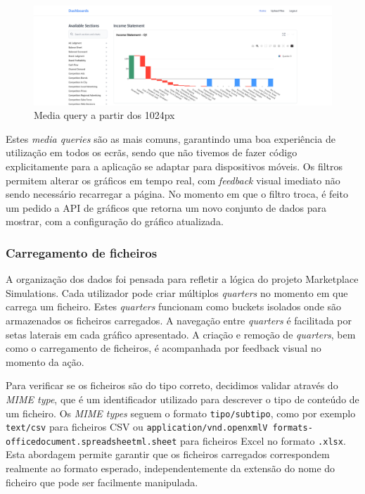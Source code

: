 \begin{figure}[htbp]
    \centering
    \includegraphics[max width=\textwidth]{./img/res_1920}
 \caption{Media query a partir dos 1024px}
 \label{fig:res_1920}
\end{figure}

Estes \textit{media queries} são as mais comuns, garantindo uma boa experiência de utilização em todos os ecrãs, sendo que não tivemos de fazer código explicitamente para a aplicação se adaptar para dispositivos móveis. Os filtros permitem alterar os gráficos em tempo real, com \textit{feedback} visual imediato não sendo necessário recarregar a página. No momento em que o filtro troca, é feito um pedido a API de gráficos que retorna um novo conjunto de dados para mostrar, com a configuração do gráfico atualizada.

\subsubsection{Carregamento de ficheiros}

A organização dos dados foi pensada para refletir a lógica do projeto Marketplace Simulations. Cada utilizador pode criar múltiplos \textit{quarters} no momento em que carrega um ficheiro. Estes \textit{quarters} funcionam como buckets isolados onde são armazenados os ficheiros carregados. A navegação entre \textit{quarters} é facilitada por setas laterais em cada gráfico apresentado. A criação e remoção de \textit{quarters}, bem como o carregamento de ficheiros, é acompanhada por feedback visual no momento da ação.

Para verificar se os ficheiros são do tipo correto, decidimos validar através do \textit{MIME type}, que é um identificador  utilizado para descrever o tipo de conteúdo de um ficheiro. Os \textit{MIME types} seguem o formato \texttt{tipo/subtipo}, como por exemplo \texttt{text/csv} para ficheiros CSV ou \texttt{application/\allowbreak vnd\allowbreak.open\allowbreak xmlV formats-\allowbreak officedocument.\allowbreak spreadsheetml.\allowbreak sheet} para ficheiros Excel no formato \texttt{.xlsx}. Esta abordagem permite garantir que os ficheiros carregados correspondem realmente ao formato esperado, independentemente da extensão do nome do ficheiro que pode ser facilmente manipulada. 

